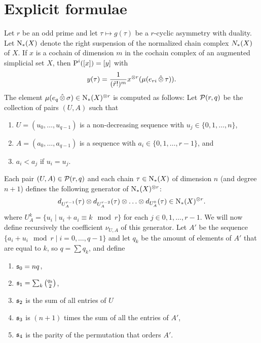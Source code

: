 
\section{Explicit formulae}\label{s:formulas}

Let $r$ be an odd prime and let $\tau\mapsto g(\tau)$ be a $r$-cyclic asymmetry with duality. Let $\operatorname{N}_{*}(X)$ denote the right suspension of the normalized chain complex $N_{*}(X)$ of $X$. If $x$ is a cochain of dimension $m$ in the cochain complex of an augmented simplicial set $X$, then $\operatorname{P}^i([x]) = [y]$ with
\[
	y(\tau) = \frac{1}{(\tilde{r}!)^{m}}x^{ \otimes  r}(\mu(e_{ri}\operatorname{\hat{\otimes}} \tau)).
\]
The element $\mu(e_{q}\operatorname{\hat{\otimes}} \sigma)\in \operatorname{N}_{*}(X)^{ \otimes  r}$ is computed as follows: Let $\mathcal{P}(r,q)$ be the collection of pairs $(U,A)$ such that
\renewcommand{\theenumi}{\roman{enumi}}%
\begin{enumerate}
	\item $U = (u_0,\ldots,u_{q-1})$ is a non-decreasing sequence with $u_j\in \{0,1,\ldots,n\}$,
	\item $A = (a_0,\ldots,a_{q-1})$ is a sequence with $a_i\in \{0,1,\ldots,r-1\}$, and
	\item\label{condfor:3} $a_i<a_j$ if $u_i=u_j$.
\end{enumerate}
Each pair $(U,A)\in \mathcal{P}(r,q)$ and each chain $\tau\in \operatorname{N}_{*}(X)$ of dimension $n$ (and degree $n+1$) defines the following generator of $\operatorname{N}_{*}(X)^{ \otimes  r}$:
\[
	d_{U_A^{r-1}}(\tau) \otimes  d_{U_A^{r-2}}(\tau) \otimes  \ldots \otimes  d_{U_A^{0}}(\tau)\in \operatorname{N}_{*}(X)^{ \otimes  r}.
\]
where $U_A^k = \{u_i\mid u_i + a_i \equiv k\mod r\}$ for each $j\in 0,1,\ldots,r-1$. We will now define recursively the coefficient $\nu_{U,A}$ of this generator. Let $A'$ be the sequence $\{a_i+u_i\mod r\mid i=0,\ldots,q-1\}$ and let $q_k$ be the amount of elements of $A'$ that are equal to $k$, so $q=\sum q_k$, and define
\renewcommand{\theenumi}{\arabic{enumi}}%
\begin{enumerate}
    \item $\mathfrak{s}_0 = nq$,
	\item $ \mathfrak{s}_1 = \sum_k\binom{q_k}{2}$,
	\item $ \mathfrak{s}_2$ is the sum of all entries of $U$
	\item $ \mathfrak{s}_3$ is $(n+1)$ times the sum of all the entries of $A'$,
	\item $ \mathfrak{s}_4$ is the parity of the permutation that orders $A'$.
\end{enumerate}
